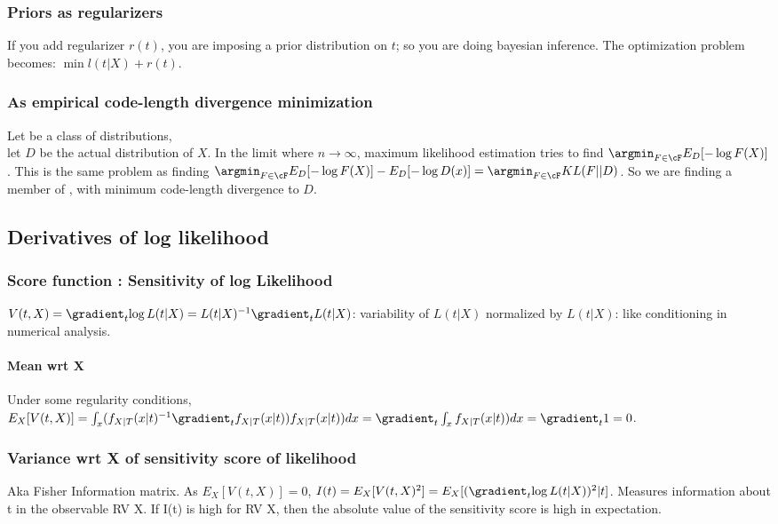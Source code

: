 \documentclass[oneside, article]{memoir}
\begin{document}
\subsubsection{Priors as regularizers}
If you add regularizer $r(t)$, you are imposing a prior distribution on $t$; so you are doing bayesian inference. The optimization problem becomes: $\min l(t|X) + r(t)$.

\subsubsection{As empirical code-length divergence minimization}
Let \cF be a class of distributions, \\
let $D$ be the actual distribution of $X$. In the limit where $n \to 
\infty$, maximum likelihood estimation tries to find $\argmin_{F \in \cF} E_D[- \log F(X)]$. This is the same problem as finding $\argmin_{F \in \cF} E_D[- \log F(X)] - E_D[-\log D(x)] = \argmin_{F \in \cF} KL(F||D)$. So we are finding a member of \cF, with minimum code-length divergence to $D$.

\subsection{Derivatives of log likelihood}
\subsubsection{Score function : Sensitivity of log Likelihood}
$V(t, X) = \gradient_t{\log L(t|X)} =  L(t|X)^{-1} \gradient_t L(t|X)$: variability of $L(t|X)$ normalized by $L(t|X)$: like conditioning in numerical analysis.

\paragraph*{Mean wrt X}
Under some regularity conditions, \\
$E_X[V(t, X)] = \int_x (f_{X|T}(x|t)^{-1} \gradient_t f_{X|T}(x|t)) f_{X|T}(x|t))dx =\\
 \gradient_t \int_x f_{X|T}(x|t)) dx = \gradient_t 1 = 0$.

\subsubsection{Variance wrt X of sensitivity score of likelihood}
Aka Fisher Information matrix. As $E_X[V(t, X)] = 0$, $I(t) = E_X[V(t, X)^{2}] = E_X[(\gradient_t{\log L(t|X)})^{2} | t]$. Measures information about t in the observable RV X. If I(t) is high for RV X, then the absolute value of the sensitivity score is high in expectation.
\end{document}
